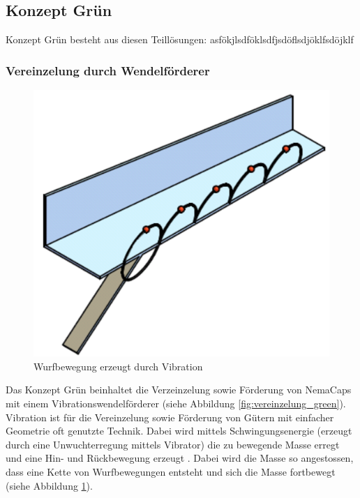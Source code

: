 \newpage
\subsection{Konzept Grün}
\label{KonzeptGreen}
Konzept Grün besteht aus diesen Teillösungen: asfökjlsdföklsdfjsdöflsdjöklfsdöjklf
\newline

\subsubsection{Vereinzelung durch Wendelförderer}
\begin{figure}
	\includegraphics[scale=0.2]{Illustrationen/5-Konzept/foerderbewegung.png}
	\caption{Wurfbewegung erzeugt durch Vibration}
	\label{fig:foerderbewegung}
\end{figure}
Das Konzept Grün beinhaltet die Verzeinzelung sowie Förderung von NemaCaps mit einem Vibrationswendelförderer (siehe Abbildung \ref{fig:vereinzelung_green}). Vibration ist für die Vereinzelung sowie Förderung von Gütern mit einfacher Geometrie oft genutzte Technik. Dabei wird mittels Schwingungsenergie (erzeugt durch eine Unwuchterregung mittels Vibrator) die zu bewegende Masse erregt und eine Hin- und Rückbewegung erzeugt \cite{risch}. Dabei wird die Masse so angestossen, dass eine Kette von Wurfbewegungen entsteht und sich die Masse fortbewegt (siehe Abbildung \ref{fig:foerderbewegung}).

